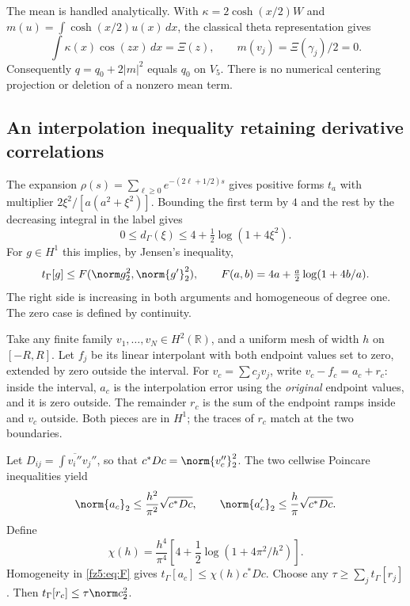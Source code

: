 \documentclass[11pt,a4paper]{article}
\numberwithin{equation}{section}
\theoremstyle{definition}\newtheorem{definition}[theorem]{Definition}
\theoremstyle{remark}\newtheorem{remark}[theorem]{Remark}
\begin{document}
The mean is handled analytically. With $\kappa=2\cosh(x/2)W$ and
$m(u)=\int\cosh(x/2)u(x)\,dx$, the classical theta representation
\cite[(1.2)]{fzLagarias} gives
\[
 \int\kappa(x)\cos(zx)\,dx=\Xi(z),\qquad
 m(v_j)=\Xi(\gamma_j)/2=0.
\]
Consequently $q=q_0+2|m|^2$ equals $q_0$ on $V_5$. There is no numerical
centering projection or deletion of a nonzero mean term.

\subsection{An interpolation inequality retaining derivative correlations}
The expansion $\rho(s)=\sum_{\ell\ge0}e^{-(2\ell+1/2)s}$ gives positive
forms $t_a$ with multiplier $2\xi^2/[a(a^2+\xi^2)]$. Bounding the first
term by $4$ and the rest by the decreasing integral in the label gives
\[
0\le d_\Gamma(\xi)\le4+\tfrac12\log(1+4\xi^2).
\]
For $g\in H^1$ this implies, by Jensen's inequality,
\begin{equation}\label{fz5:eq:F}
 t_\Gamma[g]\le F(\norm g_2^2,\norm{g'}_2^2),\qquad
 F(a,b)=4a+\tfrac a2\log(1+4b/a).
\end{equation}
The right side is increasing in both arguments and homogeneous of degree
one. The zero case is defined by continuity.

Take any finite family $v_1,\ldots,v_N\in H^2(\mathbb R)$, and a uniform
mesh of width $h$ on $[-R,R]$. Let $f_j$ be its linear interpolant with
both endpoint values set to zero, extended by zero outside the interval.
For $v_c=\sum c_jv_j$, write $v_c-f_c=a_c+r_c$: inside the interval,
$a_c$ is the interpolation error using the \emph{original} endpoint
values, and it is zero outside. The remainder $r_c$ is the sum of the
endpoint ramps inside and $v_c$ outside. Both pieces are in $H^1$;
the traces of $r_c$ match at the two boundaries.

Let $D_{ij}=\int\overline{v_i''}v_j''$, so that
$c^*Dc=\norm{v_c''}_2^2$.
The two cellwise Poincare inequalities yield
\[
 \norm{a_c}_2\le\frac{h^2}{\pi^2}\sqrt{c^*Dc},\qquad
 \norm{a_c'}_2\le\frac h\pi\sqrt{c^*Dc}.
\]
Define
\begin{equation}\label{fz5:eq:chi}
 \chi(h)=\frac{h^4}{\pi^4}
          \left[4+\frac12\log(1+4\pi^2/h^2)\right].
\end{equation}
Homogeneity in \eqref{fz5:eq:F} gives $t_\Gamma[a_c]\le\chi(h)c^*Dc$.
Choose any $\tau\ge\sum_jt_\Gamma[r_j]$. Then
$t_\Gamma[r_c]\le\tau\norm c_2^2$.
\end{document}
